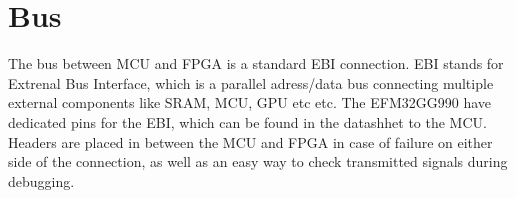\documentclass[../main/report.tex]{subfiles}
\begin{document}
\section{Bus}
The bus between MCU and FPGA is a standard EBI connection.
EBI stands for Extrenal Bus Interface, which is a parallel adress/data bus connecting multiple external components like SRAM, MCU, GPU etc etc.
The EFM32GG990 have dedicated pins for the EBI, which can be found in the datashhet to the MCU.
Headers are placed in between the MCU and FPGA in case of failure on either side of the connection, as well as an easy way to check transmitted signals during debugging.
\end{document}
